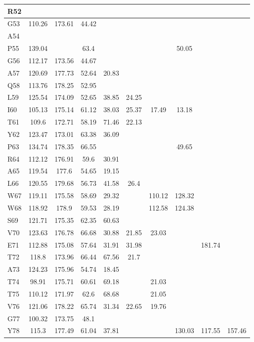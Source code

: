 \documentclass[%
 aip,
 amsmath,amssymb,
 preprint,%
]{revtex4-1}
\begin{document}
\begin{center}
\begin{longtable}{l|c|c|c|c|c|c|c|c|c}
R52 & & & & & & & & & \\ \hline
G53 & 110.26 & 173.61 & 44.42 & & & & & & \\ \hline
A54 & & & & & & & & & \\ \hline
P55 & 139.04 & & 63.4 & & & & 50.05 & & \\ \hline
G56 & 112.17 & 173.56 & 44.67 & & & & & & \\ \hline
A57 & 120.69 & 177.73 & 52.64 & 20.83 & & & & & \\ \hline
Q58 & 113.76 & 178.25 & 52.95 & & & & & & \\ \hline
L59 & 125.54 & 174.09 & 52.65 & 38.85 & 24.25 & & & & \\ \hline
I60 & 105.13 & 175.14 & 61.12 & 38.03 & 25.37 & 17.49 & 13.18 & & \\ \hline
T61 & 109.6 & 172.71 & 58.19 & 71.46 & 22.13 & & & & \\ \hline
Y62 & 123.47 & 173.01 & 63.38 & 36.09 & & & & & \\ \hline
P63 & 134.74 & 178.35 & 66.55 & & & & 49.65 & & \\ \hline
R64 & 112.12 & 176.91 & 59.6 & 30.91 & & & & & \\ \hline
A65 & 119.54 & 177.6 & 54.65 & 19.15 & & & & & \\ \hline
L66 & 120.55 & 179.68 & 56.73 & 41.58 & 26.4 & & & & \\ \hline
W67 & 119.11 & 175.58 & 58.69 & 29.32 & & 110.12 & 128.32 & & \\ \hline
W68 & 118.92 & 178.9 & 59.53 & 28.19 & & 112.58 & 124.38 & & \\ \hline
S69 & 121.71 & 175.35 & 62.35 & 60.63 & & & & & \\ \hline
V70 & 123.63 & 176.78 & 66.68 & 30.88 & 21.85 & 23.03 & & & \\ \hline
E71 & 112.88 & 175.08 & 57.64 & 31.91 & 31.98 & & & 181.74 & \\ \hline
T72 & 118.8 & 173.96 & 66.44 & 67.56 & 21.7 & & & & \\ \hline
A73 & 124.23 & 175.96 & 54.74 & 18.45 & & & & & \\ \hline
T74 & 98.91 & 175.71 & 60.61 & 69.18 & & 21.03 & & & \\ \hline
T75 & 110.12 & 171.97 & 62.6 & 68.68 & & 21.05 & & & \\ \hline
V76 & 121.06 & 178.22 & 65.74 & 31.34 & 22.65 & 19.76 & & & \\ \hline
G77 & 100.32 & 173.75 & 48.1 & & & & & & \\ \hline
Y78 & 115.3 & 177.49 & 61.04 & 37.81 & & & 130.03 & 117.55 & 157.46 \\ \hline

\end{longtable}
\end{center}
\end{document}
